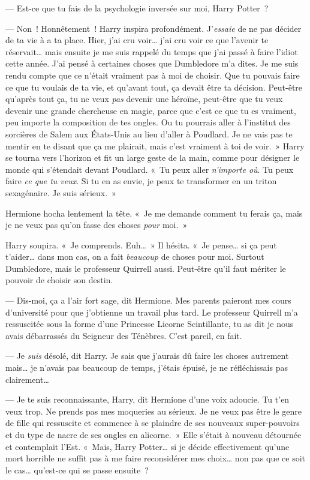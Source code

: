 --- Est-ce que tu fais de la psychologie inversée sur moi, Harry Potter~?

--- Non~!
Honnêtement~!
Harry inspira profondément.
J'\emph{essaie} de ne pas décider de ta vie à a ta place.
Hier, j'ai cru voir… j'ai cru voir ce que l'avenir te réservait… mais ensuite je me suis rappelé du temps que j'ai passé à faire l'idiot cette année.
J'ai pensé à certaines choses que Dumbledore m'a dites.
Je me suis rendu compte que ce n'était vraiment pas à moi de choisir.
Que tu pouvais faire ce que tu voulais de ta vie, et qu'avant tout, ça devait être ta décision.
Peut-être qu'après tout ça, tu ne veux \emph{pas} devenir une héroïne, peut-être que tu veux devenir une grande chercheuse en magie, parce que c'est ce que tu es vraiment, peu importe la composition de tes ongles.
Ou tu pourrais aller à l'institut des sorcières de Salem aux États-Unis au lieu d'aller à Poudlard.
Je ne vais pas te mentir en te disant que ça me plairait, mais c'est vraiment à toi de voir.~»
Harry se tourna vers l'horizon et fit un large geste de la main, comme pour désigner le monde qui s'étendait devant Poudlard.
«~Tu peux aller \emph{n'importe où}.
Tu peux faire \emph{ce que tu veux}.
Si tu en as envie, je peux te transformer en un triton sexagénaire.
Je suis sérieux.~»

Hermione hocha lentement la tête.
«~Je me demande comment tu ferais ça, mais je ne veux pas qu'on fasse des choses \emph{pour} moi.~»

Harry soupira.
«~Je comprends.
Euh…~» Il hésita.
«~Je pense… si ça peut t'aider… dans mon cas, on a fait \emph{beaucoup} de choses pour moi.
Surtout Dumbledore, mais le professeur Quirrell aussi.
Peut-être qu'il faut mériter le pouvoir de choisir son destin.

--- Dis-moi, ça a l'air fort sage, dit Hermione.
Mes parents paieront mes cours d'université pour que j'obtienne un travail plus tard.
Le professeur Quirrell m'a ressuscitée sous la forme d'une Princesse Licorne Scintillante, tu as dit je nous avais débarrassés du Seigneur des Ténèbres.
C'est pareil, en fait.

--- Je \emph{suis} désolé, dit Harry.
Je sais que j'aurais dû faire les choses autrement mais… je n'avais pas beaucoup de temps, j'étais épuisé, je ne réfléchissais pas clairement…

--- Je te suis reconnaissante, Harry, dit Hermione d'une voix adoucie.
Tu t'en veux trop.
Ne prends pas mes moqueries au sérieux.
Je ne veux pas être le genre de fille qui ressuscite et commence à se plaindre de ses nouveaux super-pouvoirs et du type de nacre de ses ongles en alicorne.~»
Elle s'était à nouveau détournée et contemplait l'Est.
«~Mais, Harry Potter… si je décide effectivement qu'une mort horrible ne suffit pas à me faire reconsidérer mes choix… non pas que ce soit le cas… qu'est-ce qui se passe ensuite~?

